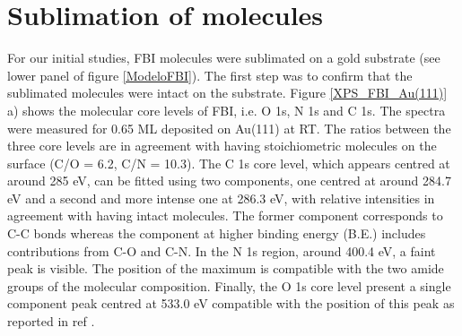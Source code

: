 \documentclass[aps,prl,reprint,longbibliography,superscriptaddress, english]{revtex4-1}
\begin{document}

\section{Sublimation of molecules}
For our initial studies, FBI molecules were sublimated on a gold substrate (see lower panel of figure \ref{ModeloFBI}). The first step was 
to confirm that the sublimated molecules were intact on the substrate. Figure \ref{XPS_FBI_Au(111)} a) shows the molecular core levels of FBI, i.e. O 1s, N 1s and C 1s. The spectra were measured for 0.65 ML deposited on Au(111) at RT. The ratios between the three core levels are in agreement with having stoichiometric molecules on the surface (C/O = 6.2, C/N = 10.3). The C 1s core level, which appears centred at around 285 eV, can be fitted using two components, one centred at around 284.7 eV and a second and more intense one at 286.3 eV, with relative intensities in agreement with having intact molecules. The former component corresponds to C-C bonds whereas the component at higher binding energy (B.E.) includes contributions from C-O and C-N. In the N 1s region, around 400.4 eV, a faint peak is visible. The position of the maximum is compatible with the two amide groups of the molecular composition. Finally, the O 1s core level present a single component peak centred at 533.0 eV compatible with the position of this peak as reported in ref \cite{stredansky_-surface_2019}. 
\end{document}
